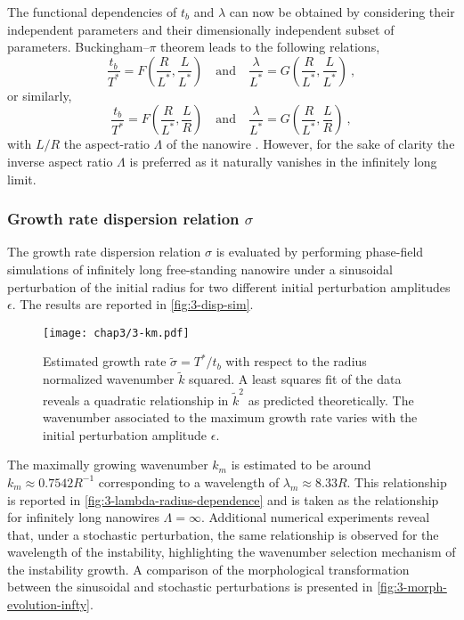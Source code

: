 The functional dependencies of $t_b$ and $\lambda$ can now be obtained by considering their independent parameters and their dimensionally independent subset of parameters. Buckingham--$\pi$ theorem leads to the following relations,
\begin{equation}
    \frac{t_b}{T^*} = F\left(\frac{R}{L^*}, \frac{L}{L^*}\right) \quad \text{and} \quad \frac{\lambda}{L^*} = G\left(\frac{R}{L^*}, \frac{L}{L^*}\right)\ ,
\end{equation}
or similarly,
\begin{equation}
    \frac{t_b}{T^*} = F\left(\frac{R}{L^*}, \frac{L}{R}\right) \quad \text{and} \quad \frac{\lambda}{L^*} = G\left(\frac{R}{L^*}, \frac{L}{R}\right)\ ,
\end{equation}
with $L/R$ the aspect-ratio $\Lambda$ of the nanowire \cite{JiuSuganuma2016,AmosBhattacharyaNestlerAnkit2018,AmosMushongeraMittnachtNestler2018}. However, for the sake of clarity the inverse aspect ratio $\Lambda$ is preferred as it naturally vanishes in the infinitely long limit.
\subsubsection{Growth rate dispersion relation $\sigma$}
The growth rate dispersion relation $\sigma$ is evaluated by performing phase-field simulations of infinitely long free-standing nanowire under a sinusoidal perturbation of the initial radius for two different initial perturbation amplitudes $\epsilon$. The results are reported in \autoref{fig:3-disp-sim}.

\begin{figure}[H]
    \centering
    \texttt{[image: chap3/3-km.pdf]}
    \caption{Estimated growth rate $\tilde{\sigma}=T^*/t_b$ with respect to the radius normalized wavenumber $\tilde{k}$ squared. A least squares fit of the data reveals a quadratic relationship in $\tilde{k}^2$ as predicted theoretically. The wavenumber associated to the maximum growth rate varies with the initial perturbation amplitude $\epsilon$.}
    \label{fig:3-disp-sim}
\end{figure}

The maximally growing wavenumber $k_m$ is estimated to be around $k_m \approx 0.7542 R^{-1}$ corresponding to a wavelength of $\lambda_m \approx 8.33 R$. This relationship is reported in \autoref{fig:3-lambda-radius-dependence} and is taken as the relationship for infinitely long nanowires $\Lambda=\infty$. Additional numerical experiments reveal that, under a stochastic perturbation, the same relationship is observed for the wavelength of the instability, highlighting the wavenumber selection mechanism of the instability growth. A comparison of the morphological transformation between the sinusoidal and stochastic perturbations is presented in \autoref{fig:3-morph-evolution-infty}.

